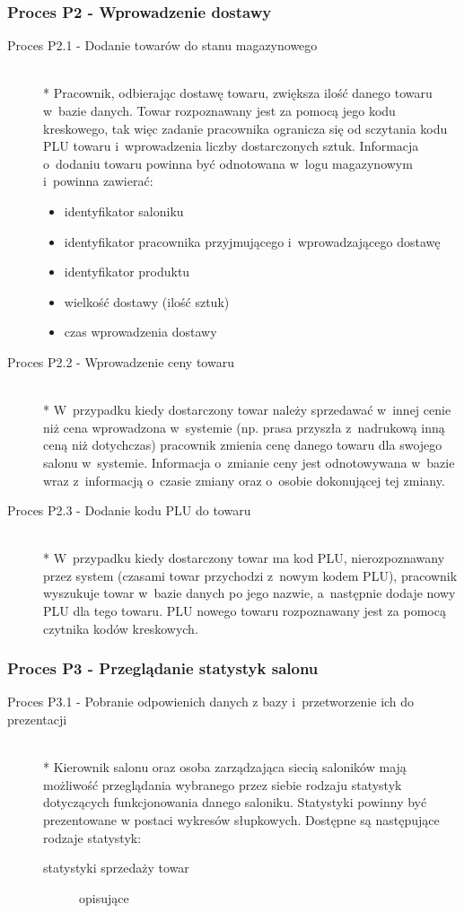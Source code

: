 \subsubsection{Proces P2 - Wprowadzenie dostawy}
\begin{description}
\item[Proces P2.1 - Dodanie towarów do stanu magazynowego] ~\\*
Pracownik, odbierając dostawę towaru, zwiększa ilość danego towaru w~bazie danych. Towar rozpoznawany jest za pomocą jego kodu kreskowego, tak więc zadanie pracownika ogranicza się od sczytania kodu PLU towaru i~wprowadzenia liczby dostarczonych sztuk. Informacja o~dodaniu towaru powinna być odnotowana w~logu magazynowym i~powinna zawierać:
\begin{itemize}
\item identyfikator saloniku
\item identyfikator pracownika przyjmującego i~wprowadzającego dostawę
\item identyfikator produktu
\item wielkość dostawy (ilość sztuk)
\item czas wprowadzenia dostawy
\end{itemize}
\item[Proces P2.2 - Wprowadzenie ceny towaru] ~\\*
W~przypadku kiedy dostarczony towar należy sprzedawać w~innej cenie niż cena wprowadzona w~systemie (np. prasa przyszła z~nadrukową inną ceną niż dotychczas) pracownik zmienia cenę danego towaru dla swojego salonu w~systemie. Informacja o~zmianie ceny jest odnotowywana w~bazie wraz z~informacją o~czasie zmiany oraz o~osobie dokonującej tej zmiany.
\item[Proces P2.3 - Dodanie kodu PLU do towaru] ~\\*
W~przypadku kiedy dostarczony towar ma kod PLU, nierozpoznawany przez system (czasami towar przychodzi z~nowym kodem PLU), pracownik wyszukuje towar w~bazie danych po jego nazwie, a~następnie dodaje nowy PLU dla tego towaru. PLU nowego towaru rozpoznawany jest za pomocą czytnika kodów kreskowych.
\end{description}
\subsubsection{Proces P3 - Przeglądanie statystyk salonu}
\begin{description}
\item[Proces P3.1 - Pobranie odpowienich danych z bazy i~przetworzenie ich do prezentacji] ~\\*
Kierownik salonu oraz osoba zarządzająca siecią saloników mają możliwość przeglądania wybranego przez siebie rodzaju statystyk dotyczących funkcjonowania danego saloniku. Statystyki powinny być prezentowane w postaci wykresów słupkowych. Dostępne są następujące rodzaje statystyk:
\begin{description}
\item[statystyki sprzedaży towar] opisujące
\end{description}
\end{description}
